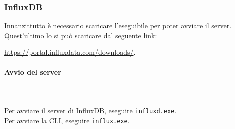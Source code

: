 	\subsubsection{InfluxDB}
	Innanzittutto è necessario scaricare l'eseguibile per poter avviare il server.
    Quest'ultimo lo si può scaricare dal seguente link:\\
	\centerline{\url{https://portal.influxdata.com/downloads/}.} 
    
	\paragraph*{Avvio del server} \mbox{} \\ \mbox{} \\
	Per avviare il server di InfluxDB, eseguire \texttt{influxd.exe}. \\
	Per avviare la CLI, eseguire \texttt{influx.exe}.